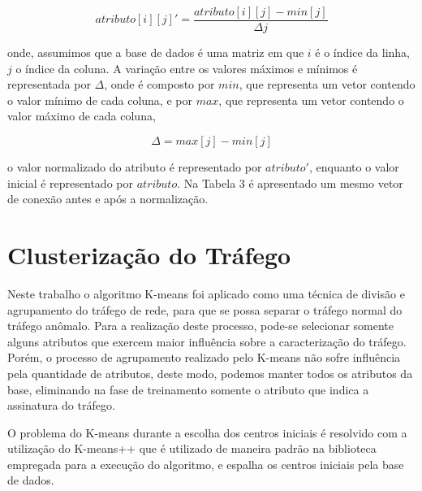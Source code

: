 \vspace{0.3cm}
\begin{equation}
\label{eq:Interpolação Linear} %
atributo[i][j]' = \frac{atributo[i][j] - min[j]}{\Delta j}
\end{equation}
\vspace{0.3cm}

\noindent onde, assumimos que a base de dados é uma matriz em que $ i $ é o índice da linha, $ j $ o índice da coluna. A variação entre os valores máximos e mínimos é representada por $ \Delta $, onde é composto por $ min $, que representa um vetor contendo o valor mínimo de cada coluna, e por  $ max $, que representa um vetor contendo o valor máximo de cada coluna,

\vspace{0.3cm}
\begin{equation}
\label{eq:Valor de Delta} %
\Delta = max[j] - min[j]
\end{equation}
\vspace{0.3cm}

\noindent o valor normalizado do atributo é representado por $ atributo' $, enquanto o valor inicial é representado por $ atributo $. Na Tabela 3 é apresentado um mesmo vetor de conexão antes e após a normalização.



  \section{Clusterização do Tráfego}

\indent Neste trabalho o algoritmo K-means foi aplicado como uma técnica de divisão e agrupamento do tráfego de rede, para que se possa separar o tráfego normal do tráfego anômalo. Para a realização deste processo, pode-se selecionar somente alguns atributos que exercem maior influência sobre a caracterização do tráfego. Porém, o processo de agrupamento realizado pelo K-means não sofre influência pela quantidade de atributos, deste modo, podemos manter todos os atributos da base, eliminando na fase de treinamento somente o atributo que indica a assinatura do tráfego.

\indent O problema do K-means durante a escolha dos centros iniciais é resolvido com a utilização do K-means++ \cite{arthur2007} que é utilizado de maneira padrão na biblioteca empregada para a execução do algoritmo, e espalha os centros iniciais pela base de dados.

